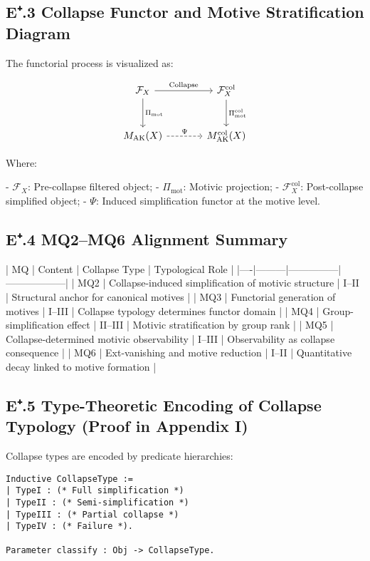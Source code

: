 \documentclass[11pt]{article}
\begin{document}
\subsection*{E⁺.3 Collapse Functor and Motive Stratification Diagram}

The functorial process is visualized as:

\[
\begin{tikzcd}[column sep=large, row sep=large]
\mathcal{F}_X \arrow[r, "\mathrm{Collapse}"] \arrow[d, "\Pi_{\mathrm{mot}}"]
& \mathcal{F}_X^{\mathrm{col}} \arrow[d, "\Pi_{\mathrm{mot}}^{\mathrm{col}}"] \\
M_{\mathrm{AK}}(X) \arrow[r, dashed, "\Psi"]
& M_{\mathrm{AK}}^{\mathrm{col}}(X)
\end{tikzcd}
\]

Where:

- $\mathcal{F}_X$: Pre-collapse filtered object;
- $\Pi_{\mathrm{mot}}$: Motivic projection;
- $\mathcal{F}_X^{\mathrm{col}}$: Post-collapse simplified object;
- $\Psi$: Induced simplification functor at the motive level.

\subsection*{E⁺.4 MQ2–MQ6 Alignment Summary}

| MQ | Content | Collapse Type | Typological Role |
|----|---------|---------------|------------------|
| MQ2 | Collapse-induced simplification of motivic structure | I–II | Structural anchor for canonical motives |
| MQ3 | Functorial generation of motives | I–III | Collapse typology determines functor domain |
| MQ4 | Group-simplification effect | II–III | Motivic stratification by group rank |
| MQ5 | Collapse-determined motivic observability | I–III | Observability as collapse consequence |
| MQ6 | Ext-vanishing and motive reduction | I–II | Quantitative decay linked to motive formation |

\subsection*{E⁺.5 Type-Theoretic Encoding of Collapse Typology (Proof in Appendix I)}

Collapse types are encoded by predicate hierarchies:

\begin{lstlisting}[language=Coq, caption=Collapse Type Classifier]
Inductive CollapseType :=
| TypeI : (* Full simplification *)
| TypeII : (* Semi-simplification *)
| TypeIII : (* Partial collapse *)
| TypeIV : (* Failure *).

Parameter classify : Obj -> CollapseType.
\end{lstlisting}
\end{document}
